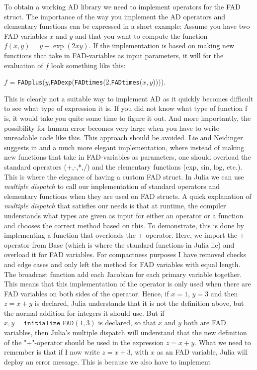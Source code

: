 To obtain a working AD library we need to implement operators for the FAD struct. The importance of the way you implement the AD operators and elementary functions can be expressed in a short example: Assume you have two FAD variables $x$ and $y$ and that you want to compute the function $f(x,y) = y+\exp(2xy)$. If the implementation is based on making new functions that take in FAD-variables as input parameters, it will for the evaluation of $f$ look something like this: 
\begin{center}
    $f$ = \texttt{FADplus}($y$,\texttt{FADexp}(\texttt{FADtimes}(2,\texttt{FADtimes}($x,y$)))).
\end{center}
This is clearly not a suitable way to implement AD as it quickly becomes difficult to see what type of expression it is. If you did not know what type of function f is, it would take you quite some time to figure it out. And more importantly, the possibility for human error becomes very large when you have to write unreadable code like this. This approach should be avoided. Lie and Neidinger suggests in \emph{\cite{lieMrstUrl}} and \emph{\cite{doi:10.1137/080743627}} a much more elegant implementation, where instead of making new functions that take in FAD-variables as parameters, one should overload the standard operators (+,-,*,/) and the elementary functions (exp, sin, log, etc.). This is where the elegance of having a custom FAD struct. In Julia we can use \emph{multiple dispatch} to call our implementation of standard operators and elementary functions when they are used on FAD structs. A quick explanation of \emph{multiple dispatch} that satisfies our needs is that at runtime, the compiler understands what types are given as input for either an operator or a function and chooses the correct method based on this. To demonstrate, this is done by implementing a function  
that overloads the + operator. Here, we import the + operator from Base (which is where the standard functions in Julia lie) and overload it for FAD variables. For compactness purposes I have removed checks and edge cases and only left the method for FAD variables with equal length. The broadcast function add each Jacobian for each primary variable together. This means that this implementation of the operator is only used when there are FAD variables on both sides of the operator. Hence, if $x = 1$, $y = 3$ and then $z = x+y$ is declared, Julia understands that it is not the definition above, but the normal addition for integers it should use. But if $x,y = \texttt{initialize\_FAD}(1,3)$ is declared, so that $x$ and $y$ both are FAD variables, then Julia's multiple dispatch will understand that the new definition of the "+"-operator should be used in the expression $z = x+y$. What we need to remember is that if I now write $z = x + 3$, with $x$ as an FAD variable, Julia will deploy an error message. This is because we also have to implement
